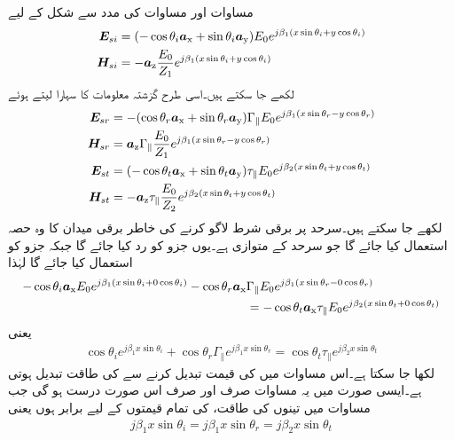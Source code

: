 مساوات  اور مساوات  کی مدد سے شکل  کے لیے
\begin{align}
{\ensuremath{{\boldsymbol{E}}}}_{si}&=(-\cos \theta_i {\boldsymbol{a}}_{\textup{x}}+\sin \theta_i {\boldsymbol{a}}_{\textup{y}})E_0  e^{j\beta_1 (x\sin \theta_i +y \cos \theta_i)}\\ 
{{\boldsymbol{H}}}_{si}&=-{\boldsymbol{a}}_{\textup{z}} \frac{E_0}{Z_1} e^{j\beta_1 (x\sin \theta_i +y \cos \theta_i)}
\end{align}
لکھے جا سکتے ہیں۔اسی طرح گزشتہ معلومات کا سہارا لیتے ہوئے
\begin{align}
{\ensuremath{{\boldsymbol{E}}}}_{sr}&= -(\cos \theta_r {\boldsymbol{a}}_{\textup{x}}+\sin \theta_r {\boldsymbol{a}}_{\textup{y}})\Gamma_{\parallel} E_0 e^{ j \beta_1 (x \sin \theta_r-y\cos \theta_r)}\\
{{\boldsymbol{H}}}_{sr}&={\boldsymbol{a}}_{\textup{z}}\Gamma_{\parallel} \frac{ E_0}{Z_1} e^{j \beta_1 (x \sin \theta_r-y\cos \theta_r)}\\
{{\boldsymbol{E}}}_{st} &= (-\cos \theta_t {\boldsymbol{a}}_{\textup{x}}+\sin \theta_t {\boldsymbol{a}}_{\textup{y}} )\tau_{\parallel} E_0 e^{j \beta_2 (x \sin \theta_t+y\cos \theta_t)}\\
{{\boldsymbol{H}}}_{st} &=-{\boldsymbol{a}}_{\textup{z}} \tau_{\parallel} \frac{E_0}{Z_2} e^{j \beta_2 (x \sin \theta_t+y\cos \theta_t)} 
\end{align}
لکھے جا سکتے ہیں۔سرحد  پر برقی شرط لاگو کرنے کی خاطر برقی میدان کا وہ حصہ استعمال کیا جائے گا جو سرحد کے متوازی ہے۔یوں  جزو کو رد کیا جائے گا جبکہ  جزو کو استعمال کیا جائے گا لہٰذا
\begin{align*}
-\cos \theta_i {\boldsymbol{a}}_{\textup{x}} E_0  e^{j\beta_1 (x\sin \theta_i +0 \cos \theta_i)}- \cos \theta_r {\boldsymbol{a}}_{\textup{x}} &\Gamma_{\parallel} E_0 e^{ j \beta_1 (x \sin \theta_r-0\cos \theta_r)}\\
&=-\cos \theta_t {\boldsymbol{a}}_{\textup{x}}\tau_{\parallel} E_0 e^{j \beta_2 (x \sin \theta_t+0\cos \theta_t)}
\end{align*}
یعنی
\begin{align}\label{مساوات_ترچھی_متوازی_قطبی_موج_برقی_شرط}
\cos \theta_i    e^{j\beta_1 x\sin \theta_i}+ \cos \theta_r \Gamma_{\parallel}  e^{ j \beta_1 x \sin \theta_r}=\cos \theta_t \tau_{\parallel}  e^{j \beta_2 x \sin \theta_t}
\end{align}
لکھا جا سکتا ہے۔اس مساوات میں  کی قیمت تبدیل کرنے سے  کی طاقت تبدیل ہوتی ہے۔ایسی صورت میں یہ مساوات صرف اور صرف اس صورت درست ہو گی جب مساوات میں تینوں  کی طاقت،  کی تمام قیمتوں کے لیے برابر ہوں یعنی
\begin{align}\label{مساوات_ترچھی_متوازی_قطبی_موج_برقی_شرط_پہلا_نتیجہ}
j \beta_1 x\sin \theta_i=j \beta_1 x \sin \theta_r=j \beta_2 x \sin \theta_t
\end{align} 
